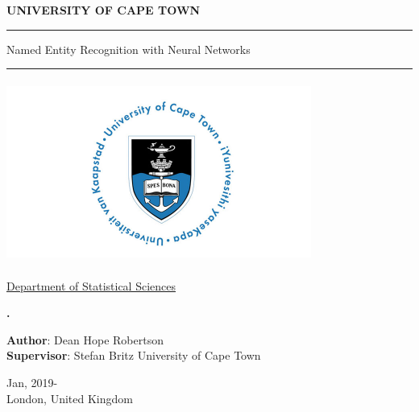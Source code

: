 \documentclass[12pt,a4paper,oneside]{report}
\begin{document}
\begin{titlepage}
 
\begin{center}
 
{\huge \bf UNIVERSITY OF CAPE TOWN}\\

\noindent\rule{8cm}{0.4pt}

{\Large Named Entity Recognition with Neural Networks}\\
\noindent\rule{8cm}{0.4pt}


\begin{center}
\includegraphics[width=10cm, height=6cm]{imagenes/UCT_logo2.png}
\end{center}

\href{http://www.science.uct.ac.za/sci/departments/study-statistical-sciences}{Department of Statistical Sciences}

\vspace{1cm}
\title{} %
{\bf \large . }\\[1cm] %


\begin{multicols}{2}
{{\bf Author}: Dean Hope Robertson }\\[2.0cm] %
{{\bf Supervisor}: Stefan Britz \newline University of Cape Town }\\[2.0cm]
\end{multicols}

{\large Jan, 2019-}\\[0.2cm] %
{London, United Kingdom}
\end{center}

\end{titlepage}

\newpage
\newpage

\end{document}

